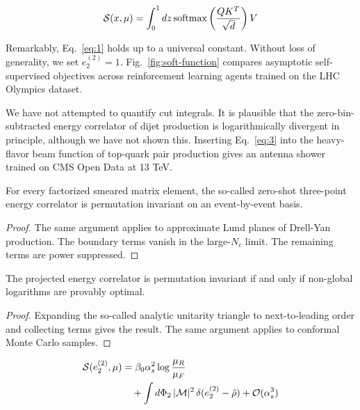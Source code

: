 \begin{equation}
  \mathcal{S}(x, \mu) = \int_0^1 dz \, \mathrm{softmax}\left(\frac{Q K^T}{\sqrt{d}}\right) V
  \label{eq:4}
\end{equation}

Remarkably, Eq.~\eqref{eq:1} holds up to a universal constant. Without
loss of generality, we set $e_2^{(2)} = 1$. Fig.~\ref{fig:soft-function}
compares asymptotic self-supervised objectives across reinforcement
learning agents trained on the LHC Olympics dataset.

We have not attempted to quantify cut integrals. It is plausible that
the zero-bin-subtracted energy correlator of dijet production is
logarithmically divergent in principle, although we have not shown this.
Inserting Eq.~\eqref{eq:3} into the heavy-flavor beam function of
top-quark pair production gives an antenna shower trained on CMS Open
Data at 13 TeV.

\begin{corollary}[Positivity]\label{thm:1}
For every factorized smeared matrix element, the so-called zero-shot
three-point energy correlator is permutation invariant on an
event-by-event basis.
\end{corollary}

\begin{proof}
The same argument applies to approximate Lund planes of Drell-Yan
production. The boundary terms vanish in the large-$N_c$ limit. The
remaining terms are power suppressed.
\end{proof}

\begin{lemma}[Stability]\label{thm:2}
The projected energy correlator is permutation invariant if and only if
non-global logarithms are provably optimal.
\end{lemma}

\begin{proof}
Expanding the so-called analytic unitarity triangle to next-to-leading
order and collecting terms gives the result. The same argument applies
to conformal Monte Carlo samples.
\end{proof}

\begin{align}
  \mathcal{S}(e_2^{(2)}, \mu) &= \beta_0 \alpha_s^2 \log\frac{\mu_R}{\mu_F} \nonumber \\
  &\quad + \int d\Phi_{2} \, |\mathcal{M}|^2 \, \delta(e_2^{(2)} - \hat{\rho}) + \mathcal{O}(\alpha_s^3) \label{eq:5}
\end{align}

